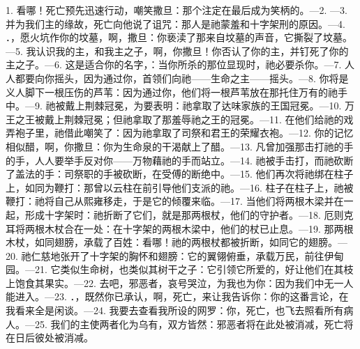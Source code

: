 1. 看哪！死亡预先迅速行动，嘲笑撒旦：那个注定在最后成为笑柄的。—\newline{}2. —\newline{}3. 并为我们主的缘故，死亡向他说了诅咒：那人是祂蒙羞和十字架刑的原因。—\newline{}4. ．，愿火坑作你的坟墓，啊，撒旦：你亵渎了那来自坟墓的声音，它撕裂了坟墓。—\newline{}5. 我认识我的主，和我主之子，啊，你撒旦！你否认了你的主，并钉死了你的主之子。—\newline{}6. 这是适合你的名字，：当你所杀的那位显现时，祂必要杀你。—\newline{}7. 人人都要向你摇头，因为通过你，首领们向祂——生命之主——摇头。—\newline{}8. 你将是义人脚下一根压伤的芦苇：因为通过你，他们将一根芦苇放在那托住万有的祂手中。—\newline{}9. 祂被戴上荆棘冠冕，为要表明：祂拿取了达味家族的王国冠冕。—\newline{}10. 万王之王被戴上荆棘冠冕；但祂拿取了那羞辱祂之王的冠冕。—\newline{}11. 在他们给祂的戏弄袍子里，祂借此嘲笑了：因为祂拿取了司祭和君王的荣耀衣袍。—\newline{}12. 你的记忆相似醋，啊，你撒旦：你为生命泉的干渴献上了醋。—\newline{}13. 凡曾加强那击打祂的手的手，人人要举手反对你——万物藉祂的手而站立。—\newline{}14. 祂被手击打，而祂砍断了盖法的手：司祭职的手被砍断，在受傅的断绝中。—\newline{}15. 他们再次将祂绑在柱子上，如同为鞭打：那曾以云柱在前引导他们支派的祂。—\newline{}16. 柱子在柱子上，祂被鞭打：祂将自己从熙雍移走，于是它的倾覆来临。—\newline{}17. 当他们将两根木梁并在一起，形成十字架时：祂折断了它们，就是那两根杖，他们的守护者。—\newline{}18. 厄则克耳将两根木杖合在一处：在十字架的两根木梁中，他们的杖已止息。—\newline{}19. 那两根木杖，如同翅膀，承载了百姓：看哪！祂的两根杖都被折断，如同它的翅膀。—\newline{}20. 祂仁慈地张开了十字架的胸怀和翅膀：它的翼翎俯垂，承载万民，前往伊甸园。—\newline{}21. 它类似生命树，也类似其树干之子：它引领它所爱的，好让他们在其枝上饱食其果实。—\newline{}22. 去吧，邪恶者，哀号哭泣，为我也为你：因为我们中无一人能进入。—\newline{}23. ．，既然你已承认，啊，死亡，来让我告诉你：你的这番言论，在我看来全是闲谈。—\newline{}24. 我要去查看我所设的网罗：你，死亡，也飞去照看所有病人。—\newline{}25. 我们的主使两者化为乌有，双方皆然：邪恶者将在此处被消减，死亡将在日后彼处被消减。\par

